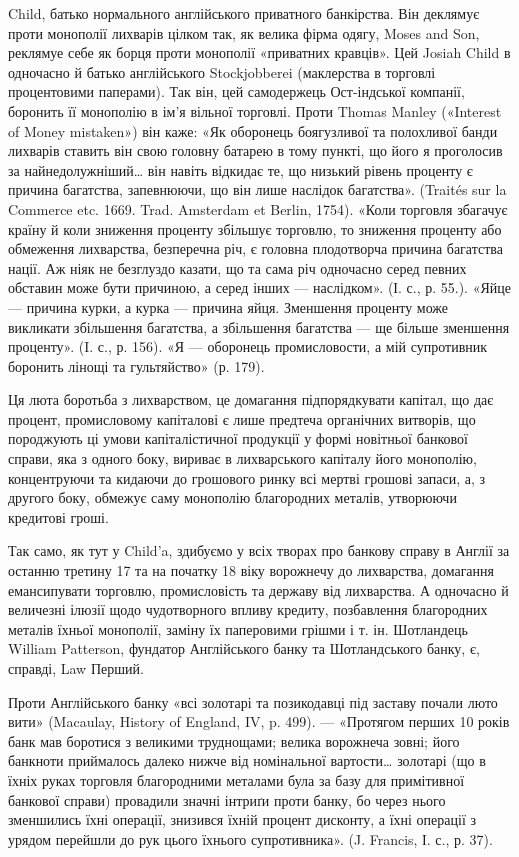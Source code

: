 \parcont{}  %
Child, батько нормального англійського приватного банкірства. Він деклямує
проти монополії лихварів цілком так, як велика фірма одягу, Moses and Son,
реклямуе себе як борця проти монополії «приватних кравців». Цей Josiah Child
в одночасно й батько англійського Stockjobberei (маклерства в торговлі процентовими
паперами). Так він, цей самодержець Ост-індської компанії, боронить її
монополію в ім’я вільної торговлі. Проти Thomas Manley («Interest of Money
mistaken») він каже: «Як оборонець боягузливої та полохливої банди лихварів
ставить він свою головну батарею в тому пункті, що його я проголосив за
найнедолужніший\dots{} він навіть відкидає те, що низький рівень проценту є причина
багатства, запевнюючи, що він лише наслідок багатства». (Traités sur la
Commerce etc. 1669. Trad. Amsterdam et Berlin, 1754). «Коли торговля збагачує
країну й коли зниження проценту збільшує торговлю, то зниження проценту
або обмеження лихварства, безперечна річ, є головна плодотворча причина багатства
нації. Аж ніяк не безглуздо казати, що та сама річ одночасно серед певних
обставин може бути причиною, а серед інших — наслідком». (І. с., р. 55.). «Яйце —
причина курки, а курка — причина яйця. Зменшення проценту може викликати
збільшення багатства, а збільшення багатства — ще більше зменшення проценту».
(I. с., р. 156). «Я — оборонець промисловости, а мій супротивник боронить
лінощі та гультяйство» (р. 179).

Ця люта боротьба з лихварством, це домагання підпорядкувати капітал, що
дає процент, промисловому капіталові є лише предтеча органічних витворів, що
породжують ці умови капіталістичної продукції у формі новітньої банкової справи,
яка з одного боку, вириває в лихварського капіталу його монополію, концентруючи
та кидаючи до грошового ринку всі мертві грошові запаси, а, з другого
боку, обмежує саму монополію благородних металів, утворюючи кредитові гроші.

Так само, як тут у Child’a, здибуємо у всіх творах про банкову справу
в Англії за останню третину 17 та на початку 18 віку ворожнечу до лихварства,
домагання емансипувати торговлю, промисловість та державу від лихварства.
А одночасно й величезні ілюзії щодо чудотворного впливу кредиту, позбавлення
благородних металів їхньої монополії, заміну їх паперовими грішми
і т. ін. Шотландець William Patterson, фундатор Англійського банку та Шотландського
банку, є, справді, Law Перший.

Проти Англійського банку «всі золотарі та позикодавці під заставу почали
люто вити» (Macaulay, History of England, IV, p. 499). — «Протягом перших
10 років банк мав боротися з великими труднощами; велика ворожнеча
зовні; його банкноти приймалось далеко нижче від номінальної вартости\dots{} золотарі
(що в їхніх руках торговля благородними металами була за базу для
примітивної банкової справи) провадили значні інтриґи проти банку, бо через
нього зменшились їхні операції, знизився їхній процент дисконту, а їхні
операції з урядом перейшли до рук цього їхнього супротивника». (J. Francis,
І. с., р. 37).

